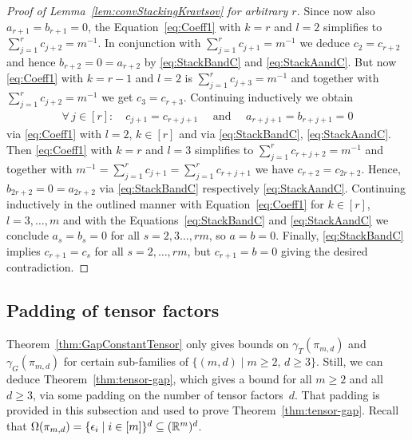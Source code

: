 \begin{proof}[Proof of Lemma~\ref{lem:convStackingKravtsov} for arbitrary $r$]
	Since now also $a_{r + 1} = b_{r +1} = 0$, the Equation~\eqref{eq:Coeff1} with $k=r$ and $l=2$ simplifies to $\sum_{j=1}^r c_{j+2} = m^{-1}$. In conjunction with $\sum_{j=1}^{r} c_{j+1} = m^{-1}$ we deduce $c_2 = c_{r+2}$ and hence $b_{r+2} = 0 = a_{r +2} $ by \eqref{eq:StackBandC} and \eqref{eq:StackAandC}. But now \eqref{eq:Coeff1} with $k=r-1$ and $l=2$ is $\sum_{j=1}^r c_{j+3} = m^{-1}$ and together with $\sum_{j=1}^r c_{j+2} = m^{-1}$ we get $c_3 = c_{r+3}$. Continuing inductively we obtain 
	\begin{align*}
		\forall \, j \in [r] \colon \quad c_{j+1} = c_{r + j + 1} \quad \text{ and } \quad a_{r + j +1} = b_{r + j + 1} = 0
	\end{align*}
	via \eqref{eq:Coeff1} with $l=2$, $k \in [r]$ and via \eqref{eq:StackBandC}, \eqref{eq:StackAandC}. Then \eqref{eq:Coeff1} with $k=r$ and $l=3$ simplifies to $\sum_{j=1}^r c_{r + j+2} = m^{-1}$ and together with $m^{-1} = \sum_{j=1}^{r} c_{j+1} =  \sum_{j=1}^{r} c_{r + j +1}$ we have $c_{r + 2} = c_{2r + 2}$. Hence, $b_{2 r+2} = 0 = a_{2 r + 2}$ via \eqref{eq:StackBandC} respectively \eqref{eq:StackAandC}. Continuing inductively in the outlined manner with Equation~\eqref{eq:Coeff1} for $k \in [r]$, $l=3,\ldots,m$ and with the Equations~\eqref{eq:StackBandC} and \eqref{eq:StackAandC} we conclude $a_s = b_s = 0$ for all $s=2,3 \ldots, r m$, so $a=b=0$. Finally, \eqref{eq:StackBandC} implies $c_{r + 1} = c_s$ for all $s = 2,\ldots, r m$, but $c_{r + 1} = b = 0$ giving the desired contradiction.
\end{proof}






\subsection{Padding of tensor factors} \label{subsec:PaddingTensors}


Theorem~\ref{thm:GapConstantTensor} only gives bounds on $\gamma_T(\pi_{m,d})$ and $\gamma_G(\pi_{m,d})$ for certain sub-families of $\{ (m,d) \mid m\geq 2, \, d \geq 3 \}$. Still, we can deduce Theorem~\ref{thm:tensor-gap}, which gives a bound for all $m \geq 2$ and all $d \geq 3$, via some padding on the number of tensor factors~$d$. That padding is provided in this subsection and used to prove Theorem~\ref{thm:tensor-gap}. Recall that $\Omega(\pi_{m,d}) = \lbrace \epsilon_{i} \mid i \in [m] \rbrace^d \subseteq (\mathbb R^m)^d$.


